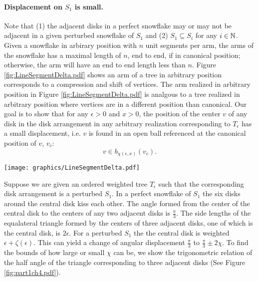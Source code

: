 
\paragraph{Displacement on $S_1$ is small.}
Note that (1) the adjacent disks in a perfect snowflake may or may not be adjacent in a given perturbed snowflake of $S_1$ and (2) $S_1 \subseteq S_i$ for any $i \in {\mathbb{N}}$.  
Given a snowflake in arbirary position with $n$ unit segments per arm, the arms of the snowflake has a maximal length of $n$, end to end, if in canonical position; otherwise, the arm will have an end to end length less than $n$.  
Figure \ref{fig:LineSegmentDelta.pdf} shows an arm of a tree in arbitrary position corresponds to a compression and shift of vertices.  
The arm realized in arbitrary position in Figure \ref{fig:LineSegmentDelta.pdf} is analgous to a tree realized in arbitrary position where vertices are in a different position than canonical.  
Our goal is to show that for any $\epsilon >0$ and $x >0$, the position of the center $v$ of any disk in the disk arrangement in any arbitrary realization corresponding to $T_\epsilon$ has a small displacement, i.e. $v$ is found in an open ball referenced at the canonical position of $v$, $v_c$: $$v \in b_{\chi(\epsilon,x)}(v_c).$$ 


\begin{minipage}{\linewidth}
\begin{center}
\texttt{[image: graphics/LineSegmentDelta.pdf]}
\label{fig:LineSegmentDelta.pdf}
\end{center}
\end{minipage}

Suppose we are given an ordered weighted tree $T_\epsilon$ such that the corresponding disk arrangement is a perturbed $S_1$.  
In a perfect snowflake of $S_1$ the six disks around the central disk kiss each other.  
The angle formed from the center of the central disk to the centers of any two adjacent disks is $\frac{\pi}{3}$.  
The side lengths of the equalateral triangle formed by the centers of three adjacent disks, one of which is the central disk, is $2\epsilon$.  
For a perturbed $S_1$ the the central disk is weighted $\epsilon+ \zeta(\epsilon)$.  
This can yield a change of angular displacement $\frac{\pi}{3}$ to $\frac{\pi}{3} \pm 2\chi$.  
To find the bounds of how large or small $\chi$ can be, we show the trigonometric relation of the half angle of the triangle corresponding to three adjacent disks (See Figure \ref{fig:part1ch4.pdf}).

